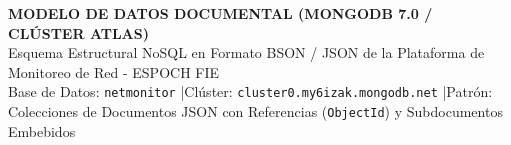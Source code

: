 \documentclass[11pt,a3paper,landscape]{article}
\begin{document}
\thispagestyle{empty}

\begin{center}
  {\Large\bfseries\sffamily MODELO DE DATOS DOCUMENTAL (MONGODB 7.0 / CLÚSTER ATLAS)}\\[0.15cm]
  {\small\sffamily Esquema Estructural NoSQL en Formato BSON / JSON de la Plataforma de Monitoreo de Red - ESPOCH FIE}\\[0.2cm]
  {\footnotesize\sffamily Base de Datos: \texttt{netmonitor} \quad|\quad Clúster: \texttt{cluster0.my6izak.mongodb.net} \quad|\quad Patrón: Colecciones de Documentos JSON con Referencias (\texttt{ObjectId}) y Subdocumentos Embebidos}
\end{center}

\vspace{0.2cm}

\begin{tikzpicture}[
  scale=0.95, every node/.style={transform shape}
]

  

\end{tikzpicture}
\end{document}
